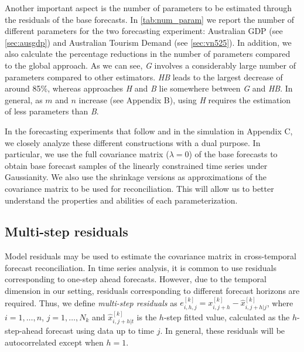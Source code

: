 \documentclass[12pt]{article}
\theoremstyle{definition}
\begin{document}
Another important aspect is the number of parameters to be estimated through the residuals of the base forecasts. In \autoref{tab:num_param} we report the number of different parameters %
for the two forecasting experiment: Australian GDP (see \autoref{sec:ausgdp}) and Australian Tourism Demand (see \autoref{sec:vn525}). In addition, we also calculate the percentage reductions in the number of parameters compared to the global approach. %
As we can see, \textit{G} involves a considerably large number of parameters compared to other estimators. \textit{HB} leads to the largest decrease of around 85\%, whereas approaches \textit{H} and \textit{B}  lie somewhere between \textit{G} and \textit{HB}. In general, as $m$ and $n$ increase (see Appendix B), using \textit{H} requires the estimation of less parameters than \textit{B}.

In the forecasting experiments that follow and in the simulation in Appendix C, we closely analyze these different constructions with a dual purpose. In particular, we use the full covariance matrix ($\lambda = 0$) of the base forecasts to obtain base forecast samples of the linearly constrained time series under Gaussianity. We also use the shrinkage versions as approximations of the covariance matrix to be used for reconciliation. This will allow us to better understand the properties and abilities of each parameterization.


\subsection{Multi-step residuals} \label{ssec:multi_res}

Model residuals may be used to estimate the covariance matrix in cross-temporal forecast reconciliation. In time series analysis, it is common to use residuals corresponding to one-step ahead forecasts. However, due to the temporal dimension in our setting, residuals corresponding to different forecast horizons are required. Thus, we define \textit{multi-step residuals} as $e_{i,h,j}^{[k]} = x_{i,j+h}^{[k]} - \widehat{x}_{i,j+h|j}^{[k]}$, where $i = 1,\dots,n$, $j = 1,\dots,N_k$ and $\widehat{x}_{i,j+h|t}^{[k]}$ is the $h$-step fitted value, calculated as the $h$-step-ahead forecast using data up to time $j$. In general, these residuals will be autocorrelated except when $h=1$.
\end{document}
